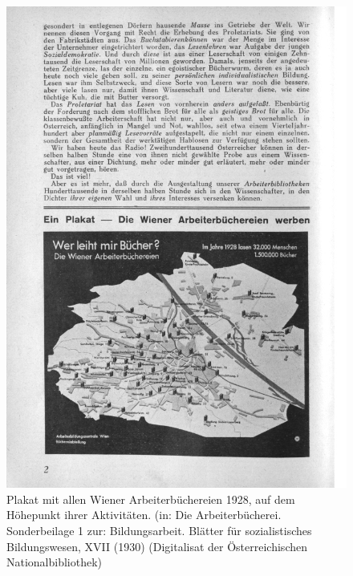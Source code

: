 \documentclass[a4paper,
fontsize=11pt,
oneside,
numbers=noperiodatend,
parskip=half-,
bibliography=totoc,
final
]{scrartcl}
\begin{document}
\begin{figure}
\centering
\includegraphics[width=.9\textwidth]{img/Schuldt05.jpg}
\caption{Plakat mit allen Wiener Arbeiterbüchereien 1928, auf dem
Höhepunkt ihrer Aktivitäten. (in: Die Arbeiterbücherei. Sonderbeilage 1
zur: Bildungsarbeit. Blätter für sozialistisches Bildungswesen, XVII
(1930) (Digitalisat der Österreichischen Nationalbibliothek)}
\end{figure}
\end{document}
